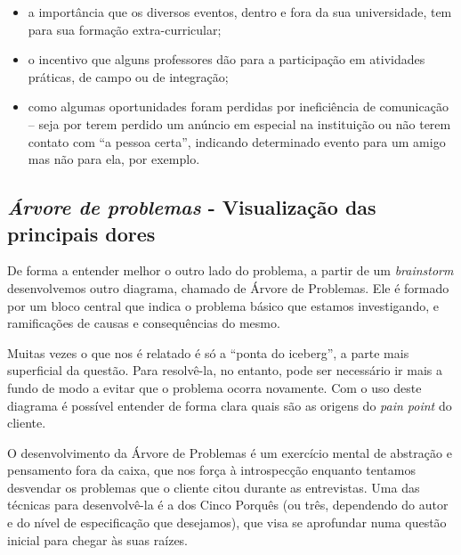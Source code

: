 \documentclass[12pt,a4paper,twoside,hyphens,english,brazil]{abntex2}
\newcommand{\conf}{{\color{OliveGreen}\framebox[1.1\width]{CNF}}}
\begin{document}
\begin{itemize}[itemsep=-1ex]
	\item  a importância que os diversos eventos, dentro e fora da sua universidade, tem para sua formação extra-curricular;
	\item  o incentivo que alguns professores dão para a participação em atividades práticas, de campo ou de integração;
	\item  como algumas oportunidades foram perdidas por ineficiência de comunicação -- seja por terem perdido um anúncio em especial na instituição ou não terem contato com ``a pessoa certa'', indicando determinado evento para um amigo mas não para ela, por exemplo.
\end{itemize}


\subsection{\emph{Árvore de problemas} - Visualização das principais dores} \label{sec:arvore-problemas}
De forma a entender melhor o outro lado do problema, a partir de um \emph{brainstorm} desenvolvemos outro diagrama, chamado de Árvore de Problemas. Ele é formado por um bloco central que indica o problema básico que estamos investigando, e ramificações de causas e consequências do mesmo.\cite{arvore-de-problemas-portal-educacao}

Muitas vezes o que nos é relatado é só a ``ponta do iceberg'', a parte mais superficial da questão. Para resolvê-la, no entanto, pode ser necessário ir mais a fundo de modo a evitar que o problema ocorra novamente. Com o uso deste diagrama é possível entender de forma clara quais são as origens do \emph{pain point} do cliente.

O desenvolvimento da Árvore de Problemas é um exercício mental de abstração e pensamento fora da caixa, que nos força à introspecção enquanto tentamos desvendar os problemas que o cliente citou durante as entrevistas. Uma das técnicas para desenvolvê-la é a dos Cinco Porquês\cite{five-whys} (ou três\cite{three-whys}\cite{three-whys-semler}, dependendo do autor e do nível de especificação que desejamos), que visa se aprofundar numa questão inicial para chegar às suas raízes.
\end{document}
